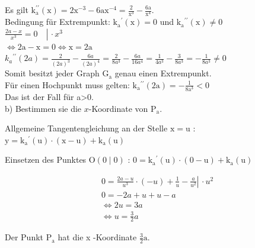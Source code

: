 \documentclass[10pt]{article}
\begin{document}
Es gilt $\mathrm{k}_{\mathrm{a}}^{\prime \prime}(\mathrm{x})=2 \mathrm{x}^{-3}-6 \mathrm{ax}^{-4}=\frac{2}{\mathrm{x}^{3}}-\frac{6 \mathrm{a}}{\mathrm{x}^{4}}$.\\
Bedingung für Extrempunkt: $\mathrm{k}_{\mathrm{a}}{ }^{\prime}(\mathrm{x})=0$ und $\mathrm{k}_{\mathrm{a}}{ }^{\prime \prime}(\mathrm{x}) \neq 0$\\
$\left.\frac{2 a-x}{x^{3}}=0 \quad \right\rvert\, \cdot x^{3}$\\
$\Leftrightarrow 2 \mathrm{a}-\mathrm{x}=0 \Leftrightarrow \mathrm{x}=2 \mathrm{a}$\\
$k_{a}{ }^{\prime \prime}(2 a)=\frac{2}{(2 a)^{3}}-\frac{6 a}{(2 a)^{4}}=\frac{2}{8 a^{3}}-\frac{6 a}{16 a^{4}}=\frac{1}{4 a^{3}}-\frac{3}{8 a^{3}}=-\frac{1}{8 a^{3}} \neq 0$\\
Somit besitzt jeder Graph $\mathrm{G}_{\mathrm{a}}$ genau einen Extrempunkt.\\
Für einen Hochpunkt muss gelten: $\mathrm{k}_{\mathrm{a}}{ }^{\prime \prime}(2 \mathrm{a})=-\frac{1}{8 \mathrm{a}^{3}}<0$\\
Das ist der Fall für a>0.\\
b) Bestimmen sie die $x$-Koordinate von $\mathrm{P}_{\mathrm{a}}$.

Allgemeine Tangentengleichung an der Stelle $\mathrm{x}=\mathrm{u}$ :\\
$\mathrm{y}=\mathrm{k}_{\mathrm{a}}{ }^{\prime}(\mathrm{u}) \cdot(\mathrm{x}-\mathrm{u})+\mathrm{k}_{\mathrm{a}}(\mathrm{u})$

Einsetzen des Punktes $\mathrm{O}(0 \mid 0)$ : $0=\mathrm{k}_{\mathrm{a}}{ }^{\prime}(\mathrm{u}) \cdot(0-\mathrm{u})+\mathrm{k}_{\mathrm{a}}(\mathrm{u})$

$$
\begin{aligned}
& \left.0=\frac{2 a-u}{u^{3}} \cdot(-u)+\frac{1}{u}-\frac{a}{u^{2}} \right\rvert\, \cdot u^{2} \\
& 0=-2 a+u+u-a \\
& \Leftrightarrow 2 u=3 a \\
& \Leftrightarrow u=\frac{3}{2} a
\end{aligned}
$$

Der Punkt $\mathrm{P}_{\mathrm{a}}$ hat die x -Koordinate $\frac{3}{2} \mathrm{a}$.
\end{document}
